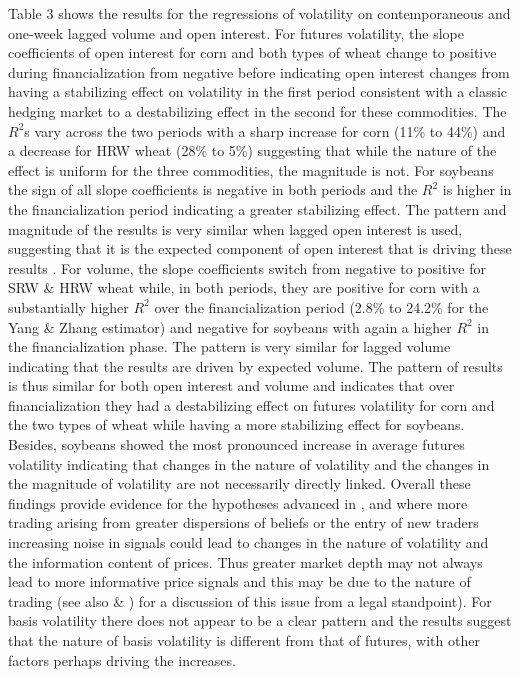 \documentclass[12pt,]{article}
\begin{document}
Table 3 shows the results for the regressions of volatility on
contemporaneous and one-week lagged volume and open interest. For
futures volatility, the slope coefficients of open interest for corn and
both types of wheat change to positive during financialization from
negative before indicating open interest changes from having a
stabilizing effect on volatility in the first period consistent with a
classic hedging market
\citep[\citet{working_new_1962}]{working_speculation_1960} to a
destabilizing effect in the second for these commodities. The \(R^{2}\)s
vary across the two periods with a sharp increase for corn (11\% to
44\%) and a decrease for HRW wheat (28\% to 5\%) suggesting that while
the nature of the effect is uniform for the three commodities, the
magnitude is not. For soybeans the sign of all slope coefficients is
negative in both periods and the \(R^{2}\) is higher in the
financialization period indicating a greater stabilizing effect. The
pattern and magnitude of the results is very similar when lagged open
interest is used, suggesting that it is the expected component of open
interest that is driving these results \citep{bessembinder_price_1993}.
For volume, the slope coefficients switch from negative to positive for
SRW \& HRW wheat while, in both periods, they are positive for corn with
a substantially higher \(R^{2}\) over the financialization period (2.8\%
to 24.2\% for the Yang \& Zhang estimator) and negative for soybeans
with again a higher \(R^{2}\) in the financialization phase. The pattern
is very similar for lagged volume indicating that the results are driven
by expected volume. The pattern of results is thus similar for both open
interest and volume and indicates that over financialization they had a
destabilizing effect on futures volatility for corn and the two types of
wheat while having a more stabilizing effect for soybeans. Besides,
soybeans showed the most pronounced increase in average futures
volatility indicating that changes in the nature of volatility and the
changes in the magnitude of volatility are not necessarily directly
linked. Overall these findings provide evidence for the hypotheses
advanced in \citet{goldstein_speculation_2014},
\citet{singleton_investor_2013} and \citet{stein_informational_1987}
where more trading arising from greater dispersions of beliefs or the
entry of new traders increasing noise in signals could lead to changes
in the nature of volatility and the information content of prices. Thus
greater market depth may not always lead to more informative price
signals and this may be due to the nature of trading (see also
\citet{stout_why_1998} \& \citet{stout_uncertainty_2011}) for a
discussion of this issue from a legal standpoint). For basis volatility
there does not appear to be a clear pattern and the results suggest that
the nature of basis volatility is different from that of futures, with
other factors perhaps driving the increases.
\end{document}
